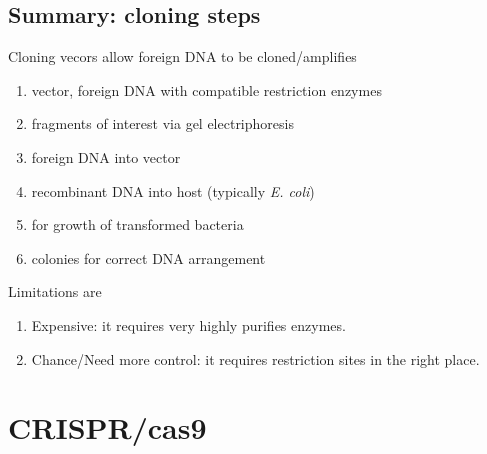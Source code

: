 \subsection{Summary: cloning steps}
Cloning vecors allow foreign DNA to be cloned/amplifies
\begin{enumerate}[itemsep=0mm]
    \item {} vector, foreign DNA with compatible restriction enzymes
    \item {} fragments of interest via gel electriphoresis
    \item {} foreign DNA into vector
    \item {} recombinant DNA into host (typically \textit{E. coli})
    \item {} for growth of transformed bacteria
    \item {} colonies for correct DNA arrangement
\end{enumerate}
Limitations are
\begin{enumerate} [itemsep=0mm]
    \item Expensive: it requires very highly purifies enzymes.
    \item Chance/Need more control: it requires restriction sites in the right place.
\end{enumerate}

\section{CRISPR/cas9}
